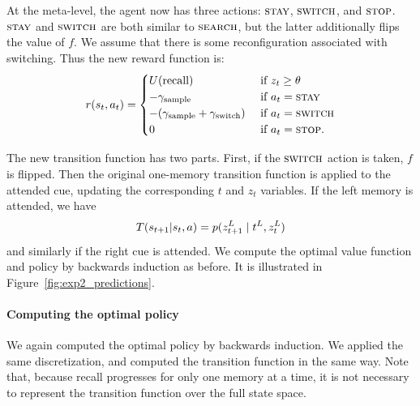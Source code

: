 At the meta-level, the agent now has three actions: $\textsc{stay}$, $\textsc{switch}$, and $\textsc{stop}$. $\textsc{stay}$ and $\textsc{switch}$ are both similar to $\textsc{search}$, but the latter additionally flips the value of $f$. We assume that there is some reconfiguration associated with switching. Thus the new reward function is:
%
\begin{equation}\label{eq:reward2}
  r(s_t, a_t) = \begin{cases} 
    U({\text{recall}}) & \text{ if } z_t \geq \theta \\
    -\gamma_\text{sample} & \text{ if } a_t = \textsc{stay} \\
    -(\gamma_\text{sample} + \gamma_\text{switch})  & \text{ if } a_t = \textsc{switch} \\
    0 & \text{ if } a_t = \textsc{stop}.
  \end{cases}
\end{equation}

The new transition function has two parts. First, if the $\textsc{switch}$ action is taken, $f$ is flipped. Then the original one-memory transition function is applied to the attended cue, updating the corresponding $t$ and $z_t$ variables. If the left memory is attended, we have
%
\begin{equation}\label{eq:transition2}
  T(s_{t+1} | s_t, a) = p(z_{t+1}^{L} \mid t^{L}, z_t^{L})
\end{equation}
and similarly if the right cue is attended. We compute the optimal value function and policy by backwards induction as before. It is illustrated in Figure~\ref{fig:exp2_predictions}.


\paragraph{Computing the optimal policy}

We again computed the optimal policy by backwards induction. We applied the same discretization, and computed the transition function in the same way. Note that, because recall progresses for only one memory at a time, it is not necessary to represent the transition function over the full state space.

